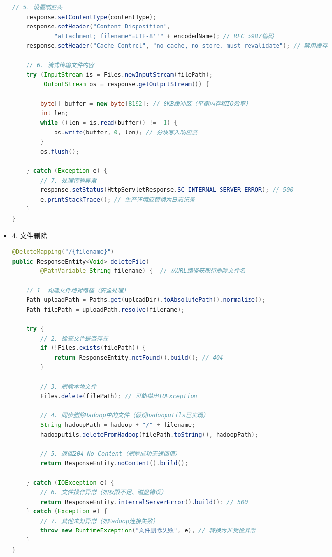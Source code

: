 \documentclass[bachelor]{thesis-uestc}
\begin{document}
\begin{itemize}
\begin{lstlisting}[language=Java]
    // 5. 设置响应头
    response.setContentType(contentType);
    response.setHeader("Content-Disposition", 
            "attachment; filename*=UTF-8''" + encodedName); // RFC 5987编码
    response.setHeader("Cache-Control", "no-cache, no-store, must-revalidate"); // 禁用缓存

    // 6. 流式传输文件内容
    try (InputStream is = Files.newInputStream(filePath);
         OutputStream os = response.getOutputStream()) {
        
        byte[] buffer = new byte[8192]; // 8KB缓冲区（平衡内存和IO效率）
        int len;
        while ((len = is.read(buffer)) != -1) {
            os.write(buffer, 0, len); // 分块写入响应流
        }
        os.flush();
        
    } catch (Exception e) {
        // 7. 处理传输异常
        response.setStatus(HttpServletResponse.SC_INTERNAL_SERVER_ERROR); // 500
        e.printStackTrace(); // 生产环境应替换为日志记录
    }
}
\end{lstlisting}
\item 4. 文件删除
\begin{lstlisting}[language=Java]
@DeleteMapping("/{filename}")
public ResponseEntity<Void> deleteFile(
        @PathVariable String filename) {  // 从URL路径获取待删除文件名
    
    // 1. 构建文件绝对路径（安全处理）
    Path uploadPath = Paths.get(uploadDir).toAbsolutePath().normalize();
    Path filePath = uploadPath.resolve(filename);

    try {
        // 2. 检查文件是否存在
        if (!Files.exists(filePath)) {
            return ResponseEntity.notFound().build(); // 404
        }

        // 3. 删除本地文件
        Files.delete(filePath); // 可能抛出IOException

        // 4. 同步删除Hadoop中的文件（假设hadooputils已实现）
        String hadoopPath = hadoop + "/" + filename;
        hadooputils.deleteFromHadoop(filePath.toString(), hadoopPath);

        // 5. 返回204 No Content（删除成功无返回值）
        return ResponseEntity.noContent().build();

    } catch (IOException e) {
        // 6. 文件操作异常（如权限不足、磁盘错误）
        return ResponseEntity.internalServerError().build(); // 500
    } catch (Exception e) {
        // 7. 其他未知异常（如Hadoop连接失败）
        throw new RuntimeException("文件删除失败", e); // 转换为非受检异常
    }
}
\end{lstlisting}


\end{itemize}
\end{document}
